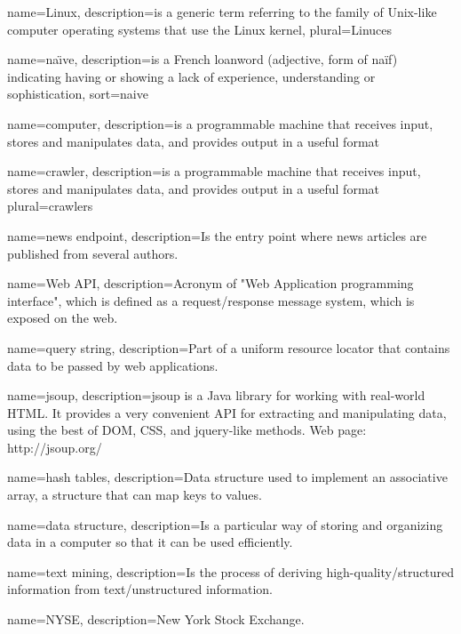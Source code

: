\makeglossaries
{}
{
  name=Linux,
  description={is a generic term referring to the family of Unix-like
               computer operating systems that use the Linux kernel},
  plural=Linuces
}

{
  name=na\"{\i}ve,
  description={is a French loanword (adjective, form of naïf)
               indicating having or showing a lack of experience,
               understanding or sophistication},
  sort=naive
}

{
  name=computer,
  description={is a programmable machine that receives input,
               stores and manipulates data, and provides
               output in a useful format}
}

{
  name=crawler,
  description={is a programmable machine that receives input,
               stores and manipulates data, and provides
               output in a useful format}
  plural=crawlers
}

{
  name=news endpoint,
  description={Is the entry point where news articles are published from several authors.}
}

{
  name=Web API,
  description={Acronym of "Web Application programming interface", which is defined as a request/response message system, which is exposed on the web.}
}

{
  name=query string,
  description={Part of a uniform resource locator that contains data to be passed by web applications.}
}

{
  name=jsoup,
  description={jsoup is a Java library for working with real-world HTML. It provides a very convenient API for extracting and manipulating data, using the best of DOM, CSS, and jquery-like methods. Web page: http://jsoup.org/}
}

{
  name=hash tables,
  description={Data structure used to implement an associative array, a structure that can map keys to values.}
}

{
  name=data structure,
  description={Is a particular way of storing and organizing data in a computer so that it can be used efficiently.}
}

{
  name=text mining,
  description={Is the process of deriving high-quality/structured information from text/unstructured information.}
}

{
  name=NYSE,
  description={New York Stock Exchange.}
}